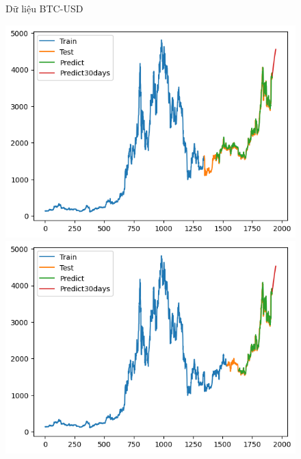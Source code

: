 \documentclass[conference]{IEEEtran}
\begin{document}
\begin{figure}[H]
\begin{minipage}{0.15\textwidth}
		\end{minipage}
		\caption{Dữ liệu BTC-USD}
		\label{fig:1}
	\end{figure}
	
	\begin{figure}[H]
		\centering
		\begin{minipage}{0.15\textwidth}
			\centering
			\includegraphics[width=1\textwidth]{Figure/GRU_ETH_73.png}
		\end{minipage}
		\hfill
		\begin{minipage}{0.15\textwidth}
			\centering
			\includegraphics[width=1\textwidth]{Figure/GRU_ETH_82.png}
		\end{minipage}
		\hfill
		\begin{minipage}{0.15\textwidth}
			\centering

\end{minipage}
\end{figure}
\end{document}
